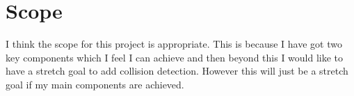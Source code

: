 \documentclass{scrartcl}
\begin{document}
\section{Scope}
I think the scope for this project is appropriate. This is because I have got two key components which I feel I can achieve and then beyond this I would like to have a stretch goal to add collision detection. However this will just be a stretch goal if my main components are achieved. 
\end{document}
